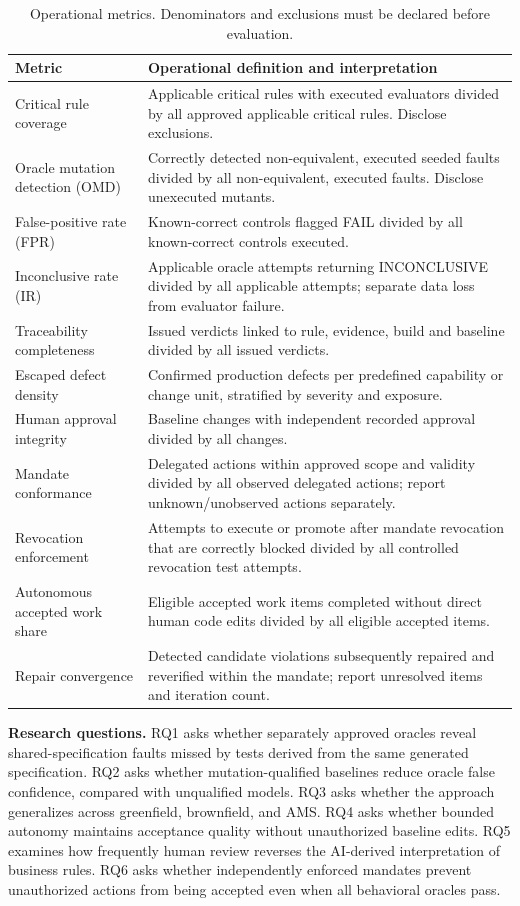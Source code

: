 \documentclass[11pt,a4paper]{article}
\newcommand{\FAIL}{\textsf{FAIL}}
\newcommand{\INC}{\textsf{INCONCLUSIVE}}
\begin{document}
\begin{table}[htbp]
\centering\footnotesize
\caption{Operational metrics. Denominators and exclusions must be declared before evaluation.}
\begin{tabularx}{\linewidth}{@{}p{39mm}X@{}}
\toprule
Metric & Operational definition and interpretation \\
\midrule
Critical rule coverage & Applicable critical rules with executed evaluators divided by all approved applicable critical rules. Disclose exclusions. \\
Oracle mutation detection (OMD) & Correctly detected non-equivalent, executed seeded faults divided by all non-equivalent, executed faults. Disclose unexecuted mutants. \\
False-positive rate (FPR) & Known-correct controls flagged \FAIL{} divided by all known-correct controls executed. \\
Inconclusive rate (IR) & Applicable oracle attempts returning \INC{} divided by all applicable attempts; separate data loss from evaluator failure. \\
Traceability completeness & Issued verdicts linked to rule, evidence, build and baseline divided by all issued verdicts. \\
Escaped defect density & Confirmed production defects per predefined capability or change unit, stratified by severity and exposure. \\
Human approval integrity & Baseline changes with independent recorded approval divided by all changes. \\
Mandate conformance & Delegated actions within approved scope and validity divided by all observed delegated actions; report unknown/unobserved actions separately. \\
Revocation enforcement & Attempts to execute or promote after mandate revocation that are correctly blocked divided by all controlled revocation test attempts. \\
Autonomous accepted work share & Eligible accepted work items completed without direct human code edits divided by all eligible accepted items. \\
Repair convergence & Detected candidate violations subsequently repaired and reverified within the mandate; report unresolved items and iteration count. \\
\bottomrule
\end{tabularx}
\label{tab:metrics}
\end{table}

\textbf{Research questions.} RQ1 asks whether separately approved oracles reveal shared-specification faults missed by tests derived from the same generated specification. RQ2 asks whether mutation-qualified baselines reduce oracle false confidence, compared with unqualified models. RQ3 asks whether the approach generalizes across greenfield, brownfield, and AMS. RQ4 asks whether bounded autonomy maintains acceptance quality without unauthorized baseline edits. RQ5 examines how frequently human review reverses the AI-derived interpretation of business rules. RQ6 asks whether independently enforced mandates prevent unauthorized actions from being accepted even when all behavioral oracles pass.
\end{document}
